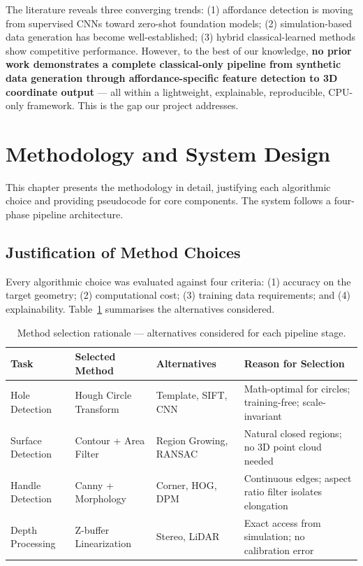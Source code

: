 \documentclass[11pt,a4paper]{article}
\begin{document}
The literature reveals three converging trends: (1) affordance detection is moving from supervised CNNs toward zero-shot foundation models; (2) simulation-based data generation has become well-established; (3) hybrid classical-learned methods show competitive performance. However, to the best of our knowledge, \textbf{no prior work demonstrates a complete classical-only pipeline from synthetic data generation through affordance-specific feature detection to 3D coordinate output} --- all within a lightweight, explainable, reproducible, CPU-only framework. This is the gap our project addresses.

\section{Methodology and System Design}

This chapter presents the methodology in detail, justifying each algorithmic choice and providing pseudocode for core components. The system follows a four-phase pipeline architecture.

\subsection{Justification of Method Choices}

Every algorithmic choice was evaluated against four criteria: (1) accuracy on the target geometry; (2) computational cost; (3) training data requirements; and (4) explainability. Table~\ref{tab:method_selection} summarises the alternatives considered.

\begin{table}[H]
\centering
\caption{Method selection rationale --- alternatives considered for each pipeline stage.}
\label{tab:method_selection}
\small
\begin{tabularx}{\textwidth}{l l l X}
\toprule
\textbf{Task} & \textbf{Selected Method} & \textbf{Alternatives} & \textbf{Reason for Selection} \\
\midrule
Hole Detection & Hough Circle Transform & Template, SIFT, CNN & Math-optimal for circles; training-free; scale-invariant \\
Surface Detection & Contour + Area Filter & Region Growing, RANSAC & Natural closed regions; no 3D point cloud needed \\
Handle Detection & Canny + Morphology & Corner, HOG, DPM & Continuous edges; aspect ratio filter isolates elongation \\
Depth Processing & Z-buffer Linearization & Stereo, LiDAR & Exact access from simulation; no calibration error \\
\bottomrule
\end{tabularx}
\end{table}
\end{document}

